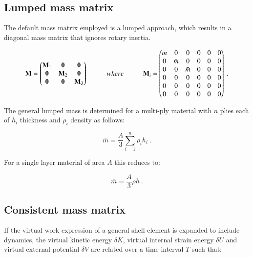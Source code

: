 \subsection{Lumped mass matrix}
The default mass matrix employed is a lumped approach, which results in a diagonal mass matrix that ignores rotary inertia.

\begin{equation} 
\mathbf{M} =  
\begin{pmatrix}
\mathbf{M}_1 & \mathbf{0} & \mathbf{0}\\
\mathbf{0} & \mathbf{M}_2 & \mathbf{0}\\
\mathbf{0} & \mathbf{0} & \mathbf{M}_3
\end{pmatrix}
\hspace{10mm}
where
\hspace{10mm}
\mathbf{M}_i =  
\begin{pmatrix}
\bar{m} & 0 & 0 & 0 & 0 & 0\\
0 & \bar{m} & 0 & 0 & 0 & 0\\
0 & 0 & \bar{m} &0 & 0 & 0\\
0 & 0 & 0 & 0 & 0 & 0\\
0 & 0 & 0 & 0 & 0 & 0\\
0 & 0 & 0 & 0 & 0 & 0
\end{pmatrix}
\label{eqt15}\ .
\end{equation}

The general lumped mass is determined for a multi-ply material with $n$ plies each of $h_i$ thickness and $\rho_i$ density as follows:

\begin{equation} 
\bar{m} = \frac{A}{3} \sum_{i=1}^n \rho_i h_i
\label{eqt16}\ .
\end{equation}

For a single layer material of area $A$ this reduces to:

\begin{equation} 
\bar{m} = \frac{A}{3} \rho h
\label{eqt17}\ .
\end{equation}

\subsection{Consistent mass matrix}
If the virtual work expression of a general shell element is expanded to include dynamics, the virtual kinetic energy $\delta K$, virtual internal strain energy $\delta U$ and virtual external potential $\delta V$ are related over a time interval $T$ such that:

